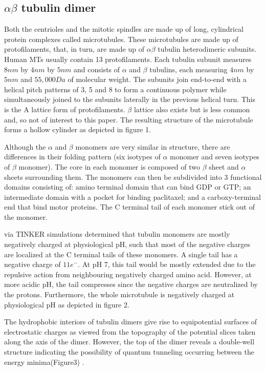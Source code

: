 \documentclass[letterpaper,final,times]{cas-dc}
\numberwithin{equation}{section}
\begin{document}
\subsection{\texorpdfstring{$\alpha\beta$} - tubulin dimer}\noindent
Both the centrioles and the mitotic spindles are made up of long, cylindrical protein complexes called microtubules. These microtubules are made up of protofilaments, that, in turn, are made up of $\alpha\beta$ tubulin heterodimeric subunits. Human MTs usually contain 13 protofilaments. Each tubulin subunit measures $8nm$ by $4nm$ by $5nm$ and consists of $\alpha$ and $\beta$ tubulins, each measuring $4nm$ by $5nm$ and $55,000 Da$ of molecular weight. The subunits join end-to-end with a helical pitch patterns of 3, 5 and 8\citep{shelanski1973,luduena1973} to form a continuous polymer while simultaneously joined to the subunits laterally in the previous helical turn. This is the A lattice form of protofilaments. $\beta$ lattice also exists but is less common and, so not of interest to this paper. The resulting structure of the microtubule forms a hollow cylinder as depicted in figure 1.

Although the $\alpha$ and $\beta$ monomers are very similar in structure, there are differences in their folding pattern (six isotypes of $\alpha$ monomer and seven isotypes of $\beta$ monomer). The core in each monomer is composed of two $\beta$ sheet and $\alpha$ sheets surrounding them. The monomers can then be subdivided into 3 functional domains consisting of: amino terminal domain that can bind GDP or GTP; an intermediate domain with a pocket for binding paclitaxel; and a carboxy-terminal end that bind motor proteins. The C terminal tail of each monomer stick out of the monomer.

\citet{tuszynski2005} via TINKER simulations determined that tubulin monomers are mostly negatively charged at physiological pH, such that most of the negative charges are localized at the C terminal tails of these monomers. A single tail has a negative charge of $11e^-$\cite{priel2005}. At pH 7, this tail would be mostly extended due to the repulsive action from neighbouring negatively charged amino acid. However, at more acidic pH, the tail compresses since the negative charges are neutralized by the protons. Furthermore, the whole microtubule is negatively charged at physiological pH as depicted in figure 2\citep{tuszynski2005}.

The hydrophobic interiors of tubulin dimers give rise to equipotential surfaces of electrostatic charges as viewed from the topography of the potential slices taken along the axis of the dimer. However, the top of the dimer reveals a double-well structure indicating the possibility of quantum tunneling
occurring between the energy minima(Figure3) .
\end{document}
